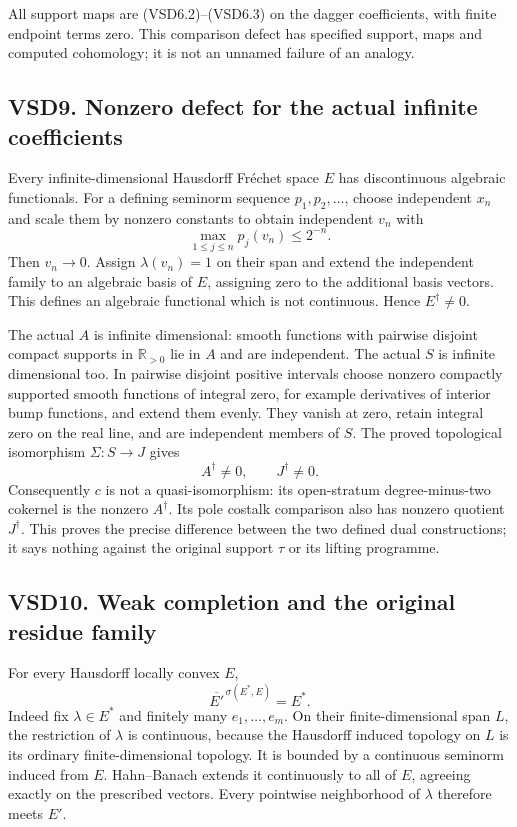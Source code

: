 All support maps are (VSD6.2)--(VSD6.3) on the dagger coefficients, with
finite endpoint terms zero. This comparison defect has specified
support, maps and computed cohomology; it is not an unnamed failure of
an analogy.

\subsection{VSD9. Nonzero defect for the actual infinite
coefficients}\label{vsd9.-nonzero-defect-for-the-actual-infinite-coefficients}

Every infinite-dimensional Hausdorff Fréchet space \(E\) has
discontinuous algebraic functionals. For a defining seminorm sequence
\(p_1,p_2,\ldots\), choose independent \(x_n\) and scale them by nonzero
constants to obtain independent \(v_n\) with \[
\max_{1\le j\le n}p_j(v_n)\le2^{-n}.
\tag{VSD9.1}
\] Then \(v_n\to0\). Assign \(\lambda(v_n)=1\) on their span and extend
the independent family to an algebraic basis of \(E\), assigning zero to
the additional basis vectors. This defines an algebraic functional which
is not continuous. Hence \(E^\dagger\ne0\).

The actual \(A\) is infinite dimensional: smooth functions with pairwise
disjoint compact supports in \(\mathbb R_{>0}\) lie in \(A\) and are
independent. The actual \(S\) is infinite dimensional too. In pairwise
disjoint positive intervals choose nonzero compactly supported smooth
functions of integral zero, for example derivatives of interior bump
functions, and extend them evenly. They vanish at zero, retain integral
zero on the real line, and are independent members of \(S\). The proved
topological isomorphism \(\Sigma:S\to J\) gives \[
A^\dagger\ne0,\qquad J^\dagger\ne0.
\tag{VSD9.2}
\] Consequently \(c\) is not a quasi-isomorphism: its open-stratum
degree-minus-two cokernel is the nonzero \(A^\dagger\). Its pole costalk
comparison also has nonzero quotient \(J^\dagger\). This proves the
precise difference between the two defined dual constructions; it says
nothing against the original support \(\tau\) or its lifting programme.

\subsection{VSD10. Weak completion and the original residue
family}\label{vsd10.-weak-completion-and-the-original-residue-family}

For every Hausdorff locally convex \(E\), \[
\overline{E'}^{\,\sigma(E^*,E)}=E^*.
\tag{VSD10.1}
\] Indeed fix \(\lambda\in E^*\) and finitely many \(e_1,\ldots,e_m\).
On their finite-dimensional span \(L\), the restriction of \(\lambda\)
is continuous, because the Hausdorff induced topology on \(L\) is its
ordinary finite-dimensional topology. It is bounded by a continuous
seminorm induced from \(E\). Hahn--Banach extends it continuously to all
of \(E\), agreeing exactly on the prescribed vectors. Every pointwise
neighborhood of \(\lambda\) therefore meets \(E'\).

